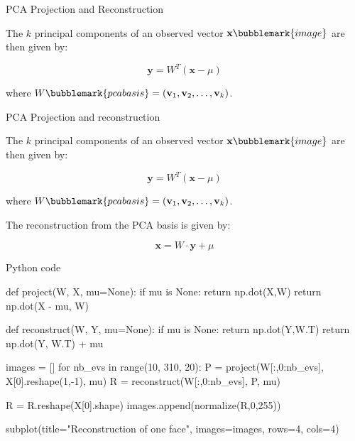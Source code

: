 \documentclass[compress]{beamer}
\begin{document}

\begin{frame}{PCA Projection and Reconstruction}

    The $k$ principal components of an observed vector
    $\mathbf{x}\bubblemark{image}$ are then given by:

    \[
        \mathbf{y} = W^{T} (\mathbf{x} - \mu)
    \]

    where $W\bubblemark{pcabasis} = (\mathbf{v}_{1}, \mathbf{v}_{2}, \ldots, \mathbf{v}_{k})$.
    

\end{frame}


\begin{frame}{PCA Projection and reconstruction}

    The $k$ principal components of an observed vector
    $\mathbf{x}\bubblemark{image}$ are then given by:

    \[
        \mathbf{y} = W^{T} (\mathbf{x} - \mu)
    \]

    where $W\bubblemark{pcabasis} = (\mathbf{v}_{1}, \mathbf{v}_{2}, \ldots, \mathbf{v}_{k})$.
    


    The reconstruction from the PCA basis is given by:

    \[
        \mathbf{x} = W \cdot \mathbf{y} + \mu
    \]

\end{frame}

\begin{frame}[fragile]{Python code}

\begin{pythoncode}
def project(W, X, mu=None):
    if mu is None:
        return np.dot(X,W)
    return np.dot(X - mu, W)

def reconstruct(W, Y, mu=None):
    if mu is None:
        return np.dot(Y,W.T)
    return np.dot(Y, W.T) + mu

images = []
for nb_evs in range(10, 310, 20):
    P = project(W[:,0:nb_evs], X[0].reshape(1,-1), mu)
    R = reconstruct(W[:,0:nb_evs], P, mu)

    R = R.reshape(X[0].shape)
    images.append(normalize(R,0,255))

subplot(title="Reconstruction of one face", images=images, rows=4, cols=4)
\end{pythoncode}
\end{frame}
\end{document}
